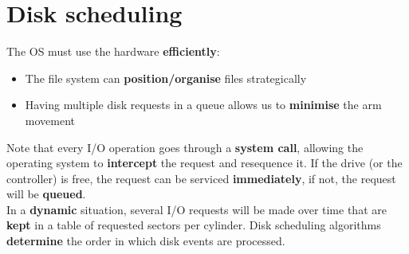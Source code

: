 \documentclass{article}
\begin{document}
\section{Disk scheduling}
\begin{flushleft}
The OS must use the hardware \textbf{efficiently}: 
\begin{itemize}
	\item The file system can \textbf{position/organise} files strategically
	\item Having multiple disk requests in a queue allows us to \textbf{minimise} the arm movement 
\end{itemize}
Note that every I/O operation goes through a \textbf{system call}, allowing the operating system to \textbf{intercept} the request and resequence it. If the drive (or the controller) is free, the request can be serviced \textbf{immediately}, if not, the request will be \textbf{queued}.\\
In a \textbf{dynamic} situation, several I/O requests will be made over time that are \textbf{kept} in a table of requested sectors per cylinder. Disk scheduling algorithms \textbf{determine} the order in which disk events are processed.
\end{flushleft}
\end{document}
